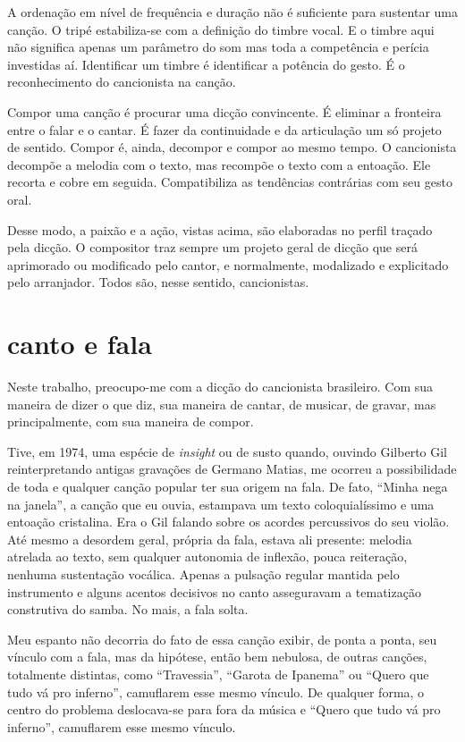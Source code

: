 A ordenação em nível de frequência e duração não é suficiente para
sustentar uma canção. O tripé estabiliza-se com a definição do timbre
vocal. E o timbre aqui não significa apenas um parâmetro do som mas toda
a competência e perícia investidas aí. Identificar um timbre é
identificar a potência do gesto. É o reconhecimento do cancionista na
canção.

Compor uma canção é procurar uma dicção convincente. É eliminar a
fronteira entre o falar e o cantar. É fazer da continuidade e da
articulação um só projeto de sentido. Compor é, ainda, decompor e compor
ao mesmo tempo. O cancionista decompõe a melodia com o texto, mas
recompõe o texto com a entoação. Ele recorta e cobre em seguida.
Compatibiliza as tendências contrárias com seu gesto oral.

Desse modo, a paixão e a ação, vistas acima, são elaboradas no perfil
traçado pela dicção. O compositor traz sempre um projeto geral de dicção
que será aprimorado ou modificado pelo cantor, e normalmente, modalizado
e explicitado pelo arranjador. Todos são, nesse sentido, cancionistas.

\section{canto e fala}

Neste trabalho, preocupo-me com a dicção do cancionista brasileiro. Com
sua maneira de dizer o que diz, sua maneira de cantar, de musicar, de
gravar, mas principalmente, com sua maneira de compor.

Tive, em 1974, uma espécie de \textit{insight} ou de susto quando, ouvindo
Gilberto Gil reinterpretando antigas gravações de Germano Matias, me
ocorreu a possibilidade de toda e qualquer canção popular ter sua origem
na fala. De fato, ``Minha nega na janela'', a canção que eu ouvia, estampava
um texto coloquialíssimo e uma entoação cristalina. Era o Gil falando
sobre os acordes percussivos do seu violão. Até mesmo a desordem geral,
própria da fala, estava ali presente: melodia atrelada ao texto, sem
qualquer autonomia de inflexão, pouca reiteração, nenhuma sustentação
vocálica. Apenas a pulsação regular mantida pelo instrumento e alguns
acentos decisivos no canto asseguravam a tematização construtiva do
samba. No mais, a fala solta.

Meu espanto não decorria do fato de essa canção exibir, de ponta a ponta,
seu vínculo com a fala, mas da hipótese, então bem nebulosa, de outras
canções, totalmente distintas, como ``Travessia'', ``Garota de Ipanema'' ou
``Quero que tudo vá pro inferno'', camuflarem esse mesmo vínculo. De
qualquer forma, o centro do problema deslocava-se para fora da música e
``Quero que tudo vá pro inferno'', camuflarem esse mesmo vínculo. 

